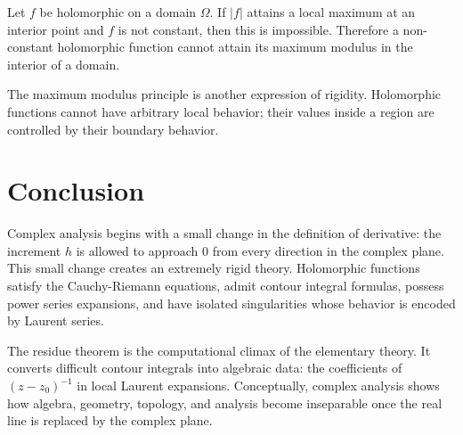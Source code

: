 \begin{theorem}
Let $f$ be holomorphic on a domain $\Omega$. If $|f|$ attains a local maximum at an interior point and $f$ is not constant, then this is impossible. Therefore a non-constant holomorphic function cannot attain its maximum modulus in the interior of a domain.
\end{theorem}

\begin{remark}
The maximum modulus principle is another expression of rigidity. Holomorphic functions cannot have arbitrary local behavior; their values inside a region are controlled by their boundary behavior.
\end{remark}

\section{Conclusion}

Complex analysis begins with a small change in the definition of derivative: the increment $h$ is allowed to approach $0$ from every direction in the complex plane. This small change creates an extremely rigid theory. Holomorphic functions satisfy the Cauchy-Riemann equations, admit contour integral formulas, possess power series expansions, and have isolated singularities whose behavior is encoded by Laurent series.

The residue theorem is the computational climax of the elementary theory. It converts difficult contour integrals into algebraic data: the coefficients of $(z-z_0)^{-1}$ in local Laurent expansions. Conceptually, complex analysis shows how algebra, geometry, topology, and analysis become inseparable once the real line is replaced by the complex plane.
